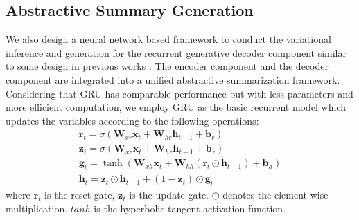 \documentclass[11pt,letterpaper]{article}
\begin{document}
\subsection{Abstractive Summary Generation}
\label{sec:summ_gen}

We also design a neural network based framework to conduct the variational inference and generation for the recurrent generative decoder component similar to some design in previous works \cite{kingma2013auto,rezende2014stochastic,gregor2015draw}.
The encoder component and the decoder component are integrated into a unified abstractive summarization framework.
Considering that GRU has comparable performance but with less parameters and more efficient computation, we employ GRU as the basic recurrent model which updates the variables according to the following operations:
\[
\begin{array}{l}
\mathbf{r}_t = \sigma (\mathbf{W}_{xr}\mathbf{x}_t + \mathbf{W}_{hr}\mathbf{h}_{t - 1} + \mathbf{b}_r)\\
\mathbf{z}_t = \sigma (\mathbf{W}_{xz}\mathbf{x}_t + \mathbf{W}_{hz}\mathbf{h}_{t - 1} + \mathbf{b}_z)\\
\mathbf{g}_t = \tanh (\mathbf{W}_{xh}\mathbf{x}_t + \mathbf{W}_{hh}(\mathbf{r}_t \odot \mathbf{h}_{t - 1}) + \mathbf{b}_h)\\
\mathbf{h}_t = \mathbf{z}_t \odot \mathbf{h}_{t - 1} + (1 - \mathbf{z}_t) \odot \mathbf{g}_t
\end{array}
\]
where $\mathbf{r}_t$ is the reset gate, $\mathbf{z}_t$ is the update gate.
$\odot$ denotes the element-wise multiplication. $tanh$ is the  hyperbolic tangent activation function.
\end{document}

